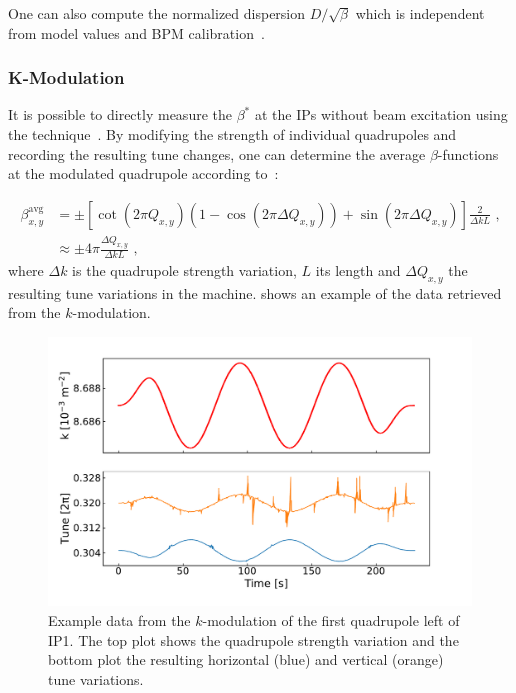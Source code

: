 One can also compute the normalized dispersion \(D / \sqrt{\beta}\) which is independent from model values and BPM calibration~\cite{PAC:Calaga:BPM_Calibration_Independent_LHC_Optics_Correction}.

\subsubsection*{K-Modulation}

It is possible to directly measure the \(\beta^{\ast}\) at the IPs without beam excitation using the  technique~\cite{IPAC:Calaga:LHC_K_Modulation}.
By modifying the strength of individual quadrupoles and recording the resulting tune changes, one can determine the average \(\beta\)-functions at the modulated quadrupole according to~\cite{BOOK:Minty:Measurements_Control_Charged_Particle_Beams}:

\begin{equation}
  \begin{aligned}
    \beta^{\mathrm{avg}}_{x,y} & =\pm \left[ \cot \left(2 \pi Q_{x,y} \right) \left( 1 - \cos \left(2 \pi \Delta Q_{x,y} \right) \right) + \sin \left( 2 \pi \Delta Q_{x,y} \right) \right] \frac{2}{\Delta k L} \text{ ,}  \\
                               & \approx \pm 4 \pi \frac{\Delta Q_{x,y}}{\Delta k L} \text{ ,}
  \end{aligned}
  \label{equation:k_modulation_average_beta}
\end{equation}
where \(\Delta k\) is the quadrupole strength variation, \(L\) its length and \(\Delta Q_{x,y}\) the resulting tune variations in the machine.
 shows an example of the data retrieved from the \(k\)-modulation.

\begin{figure}[!htb]
  \centering
  \includegraphics*[width=0.99\linewidth]{Figures/Optics_Measurements_Corrections_at_LHC/k_modulation.pdf}
  \caption{Example data from the \(k\)-modulation of the first quadrupole left of IP\num{1}. The top plot shows the quadrupole strength variation and the bottom plot the resulting horizontal (\textcolor{mplblue}{blue}) and vertical (\textcolor{mplorange}{orange}) tune variations.}
  \label{figure:kmod_mqxa1l1}
\end{figure}

